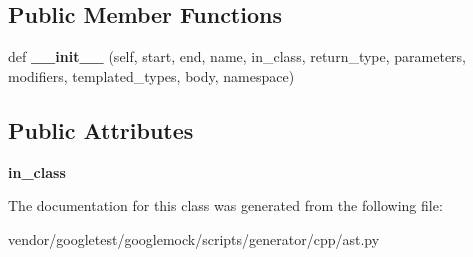 \subsection*{Public Member Functions}
\begin{DoxyCompactItemize}
\item 
def {\bfseries \+\_\+\+\_\+init\+\_\+\+\_\+} (self, start, end, name, in\+\_\+class, return\+\_\+type, parameters, modifiers, templated\+\_\+types, body, namespace)\hypertarget{classcpp_1_1ast_1_1Method_aa3cbdc9c4b7e92b15fa6acea0dbf2322}{}\label{classcpp_1_1ast_1_1Method_aa3cbdc9c4b7e92b15fa6acea0dbf2322}

\end{DoxyCompactItemize}
\subsection*{Public Attributes}
\begin{DoxyCompactItemize}
\item 
{\bfseries in\+\_\+class}\hypertarget{classcpp_1_1ast_1_1Method_aa67244c3673afed43398b5d3e3fa6c1c}{}\label{classcpp_1_1ast_1_1Method_aa67244c3673afed43398b5d3e3fa6c1c}

\end{DoxyCompactItemize}


The documentation for this class was generated from the following file\+:\begin{DoxyCompactItemize}
\item 
vendor/googletest/googlemock/scripts/generator/cpp/ast.\+py\end{DoxyCompactItemize}

